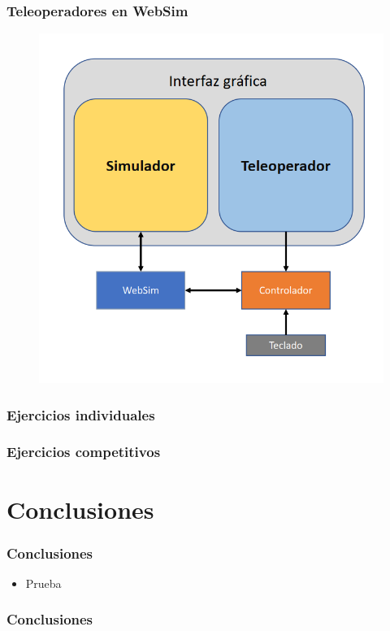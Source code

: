 \documentclass[xcolor={table}]{beamer}
\begin{document}
		\begin{frame}
			\frametitle{Teleoperadores en WebSim}
			\begin{figure}
			    \centering			    \includegraphics[scale=0.45]{img/arquitecturaTeleoperador.png}
			    \label{fig:teleop}
			\end{figure}
			
		\end{frame}

		\begin{frame}
			\frametitle{Ejercicios individuales}
		\end{frame}
		
		\begin{frame}
			\frametitle{Ejercicios competitivos}
		\end{frame}

	\section{Conclusiones}
		\begin{frame}
			\frametitle{Conclusiones}
			\begin{itemize}
				\item Prueba
			\end{itemize}
		\end{frame}
	
	\appendix

	\backupbegin
	  \begin{frame}
	    \frametitle{Conclusiones}
	  \end{frame}
	\backupend
\end{document}
